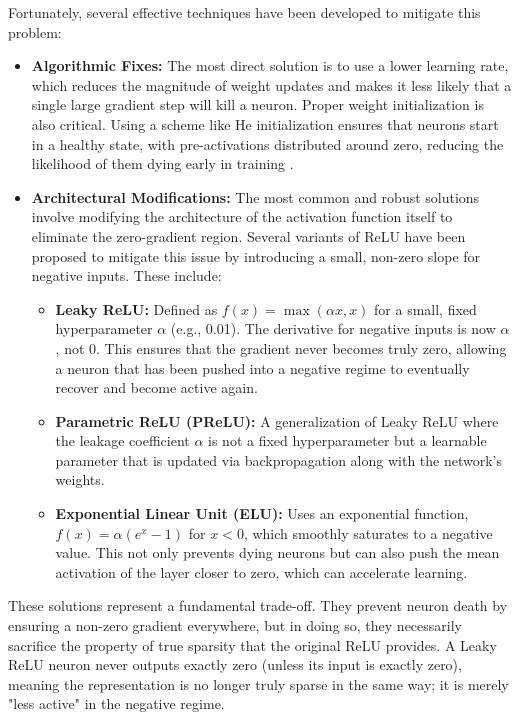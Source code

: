 Fortunately, several effective techniques have been developed to mitigate this problem:
\begin{itemize}
    \item \textbf{Algorithmic Fixes:} The most direct solution is to use a lower learning rate, which reduces the magnitude of weight updates and makes it less likely that a single large gradient step will kill a neuron. Proper weight initialization is also critical. Using a scheme like He initialization ensures that neurons start in a healthy state, with pre-activations distributed around zero, reducing the likelihood of them dying early in training \cite{He2015Delving}.

    \item \textbf{Architectural Modifications:} The most common and robust solutions involve modifying the architecture of the activation function itself to eliminate the zero-gradient region. Several variants of ReLU have been proposed to mitigate this issue by introducing a small, non-zero slope for negative inputs. These include:
    \begin{itemize}
        \item \textbf{Leaky ReLU:} Defined as $f(x) = \max(\alpha x, x)$ for a small, fixed hyperparameter $\alpha$ (e.g., 0.01). The derivative for negative inputs is now $\alpha$, not 0. This ensures that the gradient never becomes truly zero, allowing a neuron that has been pushed into a negative regime to eventually recover and become active again.
        \item \textbf{Parametric ReLU (PReLU):} A generalization of Leaky ReLU where the leakage coefficient $\alpha$ is not a fixed hyperparameter but a learnable parameter that is updated via backpropagation along with the network's weights.
        \item \textbf{Exponential Linear Unit (ELU):} Uses an exponential function, $f(x) = \alpha(e^x - 1)$ for $x < 0$, which smoothly saturates to a negative value. This not only prevents dying neurons but can also push the mean activation of the layer closer to zero, which can accelerate learning.
    \end{itemize}
\end{itemize}
These solutions represent a fundamental trade-off. They prevent neuron death by ensuring a non-zero gradient everywhere, but in doing so, they necessarily sacrifice the property of true sparsity that the original ReLU provides. A Leaky ReLU neuron never outputs exactly zero (unless its input is exactly zero), meaning the representation is no longer truly sparse in the same way; it is merely "less active" in the negative regime.

